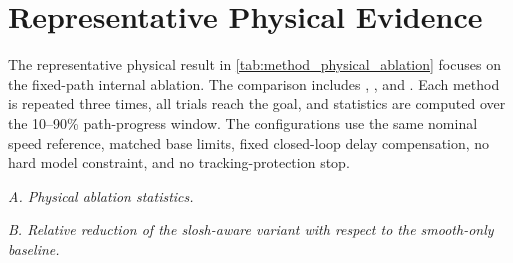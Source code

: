 \section{Representative Physical Evidence}

The representative physical result in \cref{tab:method_physical_ablation} focuses on the fixed-path internal ablation.
The comparison includes \Bzero{}, \Bsmooth{}, and \Bslosh{}.
Each method is repeated three times, all trials reach the goal, and statistics are computed over the 10--90\% path-progress window.
The configurations use the same nominal speed reference, matched base limits, fixed closed-loop delay compensation, no hard model constraint, and no tracking-protection stop.

\begin{table}[t]
  \centering
  \caption{Representative fixed-path physical internal-ablation results and relative reductions over the 10--90\% path-progress window.}
  \label{tab:method_physical_ablation}
  \label{tab:method_physical_reduction}
  \footnotesize
  \renewcommand{\arraystretch}{1.08}
  \textit{A. Physical ablation statistics.}\par\vspace{2pt}
  \setlength{\tabcolsep}{4pt}
  \vspace{4pt}

  \scriptsize
  \textit{B. Relative reduction of the slosh-aware variant with respect to the smooth-only baseline.}\par\vspace{2pt}
  \setlength{\tabcolsep}{3pt}
\end{table}

